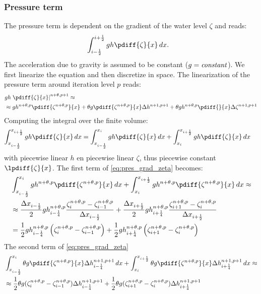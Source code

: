 \subsubsection{Pressure term} \label{sec:pressure_dependent_on_zeta}
The pressure term is dependent on the gradient of the water level $\zeta$ and reads:
\begin{align}
    & \int_{i-\half}^{i+\half} gh\pdiff{\zeta}{x} \,dx.
\end{align}
The acceleration due to gravity is assumed to be constant ($g={\it{constant}}$).
We first linearize the equation and then discretize in space.
The linearization of the pressure term around iteration level $p$ reads:
\begin{align}
    & g h \left. \pdiff{\zeta}{x} \right|^{n+\theta,p+1}  \approx
    \\
    & \approx g h^{n+\theta,p} \pdiff{\zeta^{n+\theta,p}}{x} +
    \theta g \pdiff{\zeta^{n+\theta,p}}{x} \Delta h^{n+1, p+1} +
    \theta g h^{n+\theta,p} \pdiff{}{x} \Delta \zeta^{n+1, p+1} \label{eq:pres_grad_zeta}
\end{align}
Computing the integral over the finite volume:
\begin{align}
    \int_{x_{i-\half}}^{x_{i+\half}} gh\pdiff{\zeta}{x} \,dx & = \int_{x_{i-\half}}^{x_{i}} gh\pdiff{\zeta}{x} \,dx +
    \int_{x_{i}}^{x_{i+\half}} gh\pdiff{\zeta}{x} \,dx
    \label{eq:pres_grad_zeta_fv}
\end{align}
with piecewise linear $h$ en piecewise linear $\zeta$, thus piecewise constant $\lpdiff{\zeta}{x}$.
The first term of \autoref{eq:pres_grad_zeta} becomes:
\begin{align}
    & \int_{x_{i-\half}}^{x_{i}} g h^{n+\theta,p} \pdiff{\zeta^{n+\theta,p}}{x} \,dx +
    \int_{x_{i}}^{x_{i+\half}} g h^{n+\theta,p} \pdiff{\zeta^{n+\theta,p}}{x} \,dx \approx
    \nonumber \\*
    & \approx \frac{\Dx_{i-\half}}{2}  g  h^{n+\theta,p}_{i-\quart} \frac{\zeta^{n+\theta,p}_i- \zeta^{n+\theta,p}_{i-1}}{\Dx_{i-\half}} +
    \frac{\Dx_{i+\half}}{2} g h^{n+\theta,p}_{i+\quart} \frac{\zeta^{n+\theta,p}_{i+1} - \zeta^{n+\theta,p}_{i}}{\Dx_{i+\half}}
    \\
    & = \half g h^{n+\theta,p}_{i-\quart} \left(\zeta^{n+\theta,p}_i- \zeta^{n+\theta,p}_{i-1}\right)
    +
    \half g h^{n+\theta,p}_{i+\quart} \left(\zeta^{n+\theta,p}_{i+1} - \zeta^{n+\theta,p}_{i}\right)
\end{align}
The second term of \autoref{eq:pres_grad_zeta}
\begin{align}
    & \int_{x_{i-\half}}^{x_{i}} \theta g \pdiff{\zeta^{n+\theta,p}}{x}\Delta h^{n+1, p+1}_{i-\quart} \, dx +
    \int_{x_{i}}^{x_{i+\half}} \theta g \pdiff{\zeta^{n+\theta,p}}{x}\Delta h^{n+1, p+1}_{i+\quart} \,dx \approx
    \\
    & \approx
     \half \theta g  (\zeta^{n+\theta,p}_{i}- \zeta^{n+\theta,p}_{i-1}) \Delta h^{n+1, p+1}_{i-\quart} +
     \half \theta g (\zeta^{n+\theta,p}_{i+1} - \zeta^{n+\theta,p}_{i}) \Delta h^{n+1, p+1}_{i+\quart}
\end{align}
